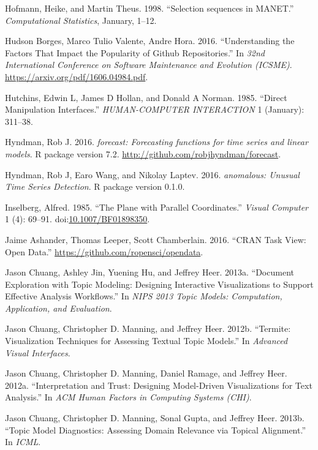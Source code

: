\documentclass[12pt,]{isuthesis}
\begin{document}
\hypertarget{ref-selection-sequences}{}
Hofmann, Heike, and Martin Theus. 1998. ``Selection sequences in
MANET.'' \emph{Computational Statistics}, January, 1--12.

\hypertarget{ref-stars}{}
Hudson Borges, Marco Tulio Valente, Andre Hora. 2016. ``Understanding
the Factors That Impact the Popularity of Github Repositories.'' In
\emph{32nd International Conference on Software Maintenance and
Evolution (ICSME)}. \url{https://arxiv.org/pdf/1606.04984.pdf}.

\hypertarget{ref-Hutchins:1985wu}{}
Hutchins, Edwin L, James D Hollan, and Donald A Norman. 1985. ``Direct
Manipulation Interfaces.'' \emph{HUMAN-COMPUTER INTERACTION} 1
(January): 311--38.

\hypertarget{ref-forecast}{}
Hyndman, Rob J. 2016. \emph{forecast: Forecasting functions for time
series and linear models}. R package version 7.2.
\url{http://github.com/robjhyndman/forecast}.

\hypertarget{ref-anomalous}{}
Hyndman, Rob J, Earo Wang, and Nikolay Laptev. 2016. \emph{anomalous:
Unusual Time Series Detection}. R package version 0.1.0.

\hypertarget{ref-Inselberg:85}{}
Inselberg, Alfred. 1985. ``The Plane with Parallel Coordinates.''
\emph{Visual Computer} 1 (4): 69--91.
doi:\href{https://doi.org/10.1007/BF01898350}{10.1007/BF01898350}.

\hypertarget{ref-OpenData}{}
Jaime Ashander, Thomas Leeper, Scott Chamberlain. 2016. ``CRAN Task
View: Open Data.'' \url{https://github.com/ropensci/opendata}.

\hypertarget{ref-2013-termite}{}
Jason Chuang, Ashley Jin, Yuening Hu, and Jeffrey Heer. 2013a.
``Document Exploration with Topic Modeling: Designing Interactive
Visualizations to Support Effective Analysis Workflows.'' In \emph{NIPS
2013 Topic Models: Computation, Application, and Evaluation}.

\hypertarget{ref-2012-termite}{}
Jason Chuang, Christopher D. Manning, and Jeffrey Heer. 2012b.
``Termite: Visualization Techniques for Assessing Textual Topic
Models.'' In \emph{Advanced Visual Interfaces}.

\hypertarget{ref-2012-trust}{}
Jason Chuang, Christopher D. Manning, Daniel Ramage, and Jeffrey Heer.
2012a. ``Interpretation and Trust: Designing Model-Driven Visualizations
for Text Analysis.'' In \emph{ACM Human Factors in Computing Systems
(CHI)}.

\hypertarget{ref-2013-diagnostics}{}
Jason Chuang, Christopher D. Manning, Sonal Gupta, and Jeffrey Heer.
2013b. ``Topic Model Diagnostics: Assessing Domain Relevance via Topical
Alignment.'' In \emph{ICML}.
\end{document}
